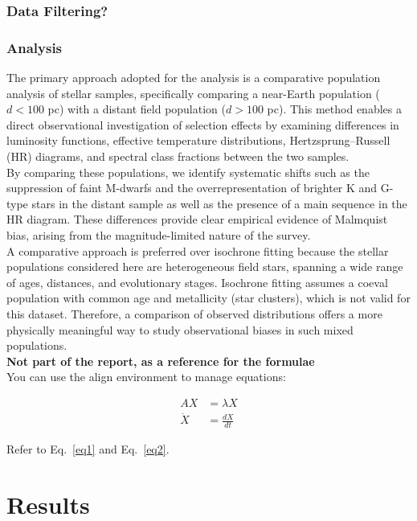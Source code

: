 \documentclass[11pt]{article}
\begin{document}
\subsubsection{Data Filtering?}

\subsubsection{Analysis}
The primary approach adopted for the analysis is a comparative population analysis of stellar samples, specifically comparing a near-Earth population ($d < 100$ pc) with a distant field population ($d > 100$ pc)\cite{Gaia2023}. This method enables a direct observational investigation of selection effects by examining differences in luminosity functions, effective temperature distributions, Hertzsprung--Russell (HR) diagrams, and spectral class fractions between the two samples.\\

\noindent By comparing these populations, we identify systematic shifts such as the suppression of faint M-dwarfs and the overrepresentation of brighter K and G-type stars in the distant sample as well as the presence of a main sequence in the HR diagram. These differences provide clear empirical evidence of Malmquist bias, arising from the magnitude-limited nature of the survey\cite{Butkevich2005}.\\

\noindent A comparative approach is preferred over isochrone fitting because the stellar populations considered here are heterogeneous field stars, spanning a wide range of ages, distances, and evolutionary stages. Isochrone fitting assumes a coeval population with common age and metallicity (star clusters), which is not valid for this dataset. Therefore, a comparison of observed distributions offers a more physically meaningful way to study observational biases in such mixed populations.\\

\textbf{Not part of the report, as a reference for the formulae}\\
\noindent You can use the align environment to manage equations:

\begin{align}
AX &= \lambda X \label{eq1} \\
\dot{X} &= \frac{dX}{dt} \label{eq2}
\end{align}

Refer to Eq.~\ref{eq1} and Eq.~\ref{eq2}.

\section{Results}
\end{document}

